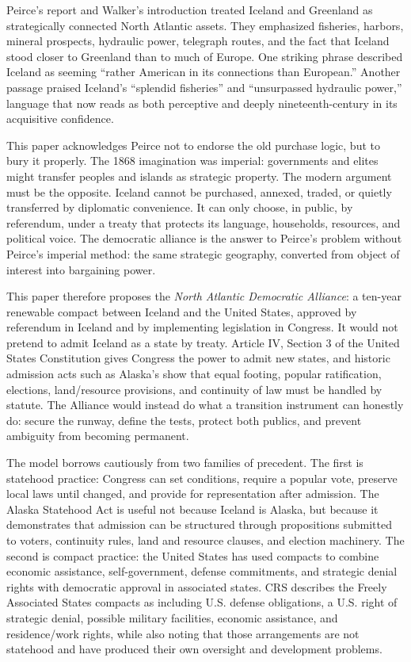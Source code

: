 \documentclass[11pt,a4paper]{article}
\begin{document}
Peirce's report and Walker's introduction treated Iceland and Greenland as strategically connected North Atlantic assets. They emphasized fisheries, harbors, mineral prospects, hydraulic power, telegraph routes, and the fact that Iceland stood closer to Greenland than to much of Europe. One striking phrase described Iceland as seeming ``rather American in its connections than European.''\cite{peirce1868} Another passage praised Iceland's ``splendid fisheries'' and ``unsurpassed hydraulic power,'' language that now reads as both perceptive and deeply nineteenth-century in its acquisitive confidence.\cite{peirce1868}

This paper acknowledges Peirce not to endorse the old purchase logic, but to bury it properly. The 1868 imagination was imperial: governments and elites might transfer peoples and islands as strategic property. The modern argument must be the opposite. Iceland cannot be purchased, annexed, traded, or quietly transferred by diplomatic convenience. It can only choose, in public, by referendum, under a treaty that protects its language, households, resources, and political voice. The democratic alliance is the answer to Peirce's problem without Peirce's imperial method: the same strategic geography, converted from object of interest into bargaining power.

This paper therefore proposes the \textit{North Atlantic Democratic Alliance}: a ten-year renewable compact between Iceland and the United States, approved by referendum in Iceland and by implementing legislation in Congress. It would not pretend to admit Iceland as a state by treaty. Article IV, Section 3 of the United States Constitution gives Congress the power to admit new states, and historic admission acts such as Alaska's show that equal footing, popular ratification, elections, land/resource provisions, and continuity of law must be handled by statute.\cite{usconstitution,alaskastatehood} The Alliance would instead do what a transition instrument can honestly do: secure the runway, define the tests, protect both publics, and prevent ambiguity from becoming permanent.

The model borrows cautiously from two families of precedent. The first is statehood practice: Congress can set conditions, require a popular vote, preserve local laws until changed, and provide for representation after admission. The Alaska Statehood Act is useful not because Iceland is Alaska, but because it demonstrates that admission can be structured through propositions submitted to voters, continuity rules, land and resource clauses, and election machinery.\cite{alaskastatehood} The second is compact practice: the United States has used compacts to combine economic assistance, self-government, defense commitments, and strategic denial rights with democratic approval in associated states. CRS describes the Freely Associated States compacts as including U.S. defense obligations, a U.S. right of strategic denial, possible military facilities, economic assistance, and residence/work rights, while also noting that those arrangements are not statehood and have produced their own oversight and development problems.\cite{crsfas,doiCOFA}
\end{document}
